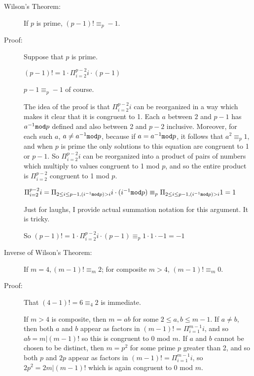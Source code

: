 \documentclass[12pt]{article}
\begin{document}
\begin{description}

\item[Wilson's Theorem:]  If $p$ is prime, $(p-1)! \equiv_p -1$.

\item[Proof:]  Suppose that $p$ is prime.  

$(p-1)! = 1\cdot \Pi_{i=2}^{p-2} i\cdot(p-1)$

$p-1 \equiv_p -1$ of course.

The idea of the proof is that $\Pi_{i=2}^{p-2}i$ can be reorganized in a way which makes it clear that it is congruent to 1.  Each $a$ between $2$ and $p-1$ has $a^{-1}{\tt mod}p$ defined and also between 2 and $p-2$ inclusive.  Moreover, for each such $a$, $a \neq a^{-1}{\tt mod} p$, because if $a=a^{-1}{\tt mod} p$, it follows that $a^2 \equiv_p 1$, and when $p$ is prime the only solutions to this equation are congruent to 1 or $p-1$.  So $\Pi_{i=2}^{p-2}i$ can be reorganized into a product of pairs of numbers which multiply to values congruent to 1 mod $p$, and so the entire product is $\Pi_{i=2}^{p-2}$ congruent to 1 mod $p$.  

$\Pi_{i=2}^{p-2}i = \Pi_{2 \leq i \leq p-1, (i^{-1}{\tt mod}p) >i}i\cdot (i^{-1}{\tt mod}p) \equiv_p \Pi_{2 \leq i \leq p-1, (i^{-1}{\tt mod}p) >i}1 =1$

Just for laughs, I provide actual summation notation for this argument.  It is tricky.

So $(p-1)! = 1\cdot \Pi_{i=2}^{p-2} i\cdot(p-1) \equiv_p 1\cdot 1\cdot -1 = -1$



\item[Inverse of Wilson's Theorem:]  If $m=4, (m-1)! \equiv_m 2$;  for composite $m>4$, $(m-1)! \equiv_m 0$.

\item[Proof:]  That $(4-1)! = 6 \equiv_4 2$ is immediate.

If $m>4$ is composite, then $m = ab$ for some $2 \leq a,b \leq m-1$.  If $a \neq b$, then both $a$ and $b$ appear as factors in $(m-1)! = \Pi_{i=1}^{m-1} i$, and so $ab=m | (m-1)!$ so this is congruent to 0 mod $m$.
If $a$ and $b$ cannot be chosen to be distinct, then $m = p^2$ for some prime $p$ greater than 2, and so both $p$ and $2p$ appear as factors in $(m-1)! = \Pi_{i=1}^{m-1} i$,
so $2p^2 = 2m | (m-1)!$ which is again congruent to 0 mod $m$.

\end{description}
\end{document}
